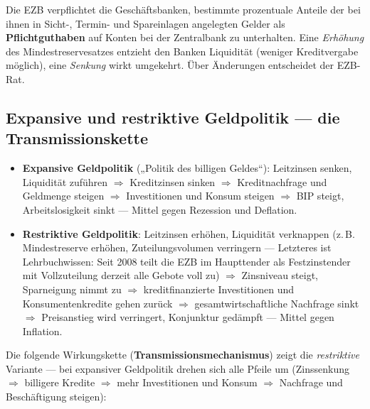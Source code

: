 \documentclass[11pt, a4paper]{article}
\begin{document}
Die EZB verpflichtet die Geschäftsbanken, bestimmte prozentuale Anteile der bei ihnen in
Sicht-, Termin- und Spareinlagen angelegten Gelder als \textbf{Pflichtguthaben} auf Konten
bei der Zentralbank zu unterhalten. Eine \emph{Erhöhung} des Mindestreservesatzes entzieht
den Banken Liquidität (weniger Kreditvergabe möglich), eine \emph{Senkung} wirkt umgekehrt.
Über Änderungen entscheidet der EZB-Rat.

\subsection{Expansive und restriktive Geldpolitik --- die Transmissionskette}

\begin{itemize}
  \item \textbf{Expansive Geldpolitik} („Politik des billigen Geldes``): Leitzinsen senken,
    Liquidität zuführen $\Rightarrow$ Kreditzinsen sinken $\Rightarrow$ Kreditnachfrage und
    Geldmenge steigen $\Rightarrow$ Investitionen und Konsum steigen $\Rightarrow$ BIP
    steigt, Arbeitslosigkeit sinkt --- Mittel gegen Rezession und Deflation.
  \item \textbf{Restriktive Geldpolitik}: Leitzinsen erhöhen, Liquidität verknappen
    (z.\,B. Mindestreserve erhöhen, Zuteilungsvolumen verringern --- Letzteres ist
    Lehrbuchwissen: Seit 2008 teilt die EZB im Haupttender als Festzinstender mit
    Vollzuteilung derzeit alle Gebote voll zu) $\Rightarrow$ Zinsniveau
    steigt, Sparneigung nimmt zu $\Rightarrow$ kreditfinanzierte Investitionen und
    Konsumentenkredite gehen zurück $\Rightarrow$ gesamtwirtschaftliche Nachfrage sinkt
    $\Rightarrow$ Preisanstieg wird verringert, Konjunktur gedämpft --- Mittel gegen
    Inflation.
\end{itemize}

Die folgende Wirkungskette (\textbf{Transmissionsmechanismus}) zeigt die
\emph{restriktive} Variante --- bei expansiver Geldpolitik drehen sich alle Pfeile um
(Zinssenkung $\Rightarrow$ billigere Kredite $\Rightarrow$ mehr Investitionen und Konsum
$\Rightarrow$ Nachfrage und Beschäftigung steigen):
\end{document}
